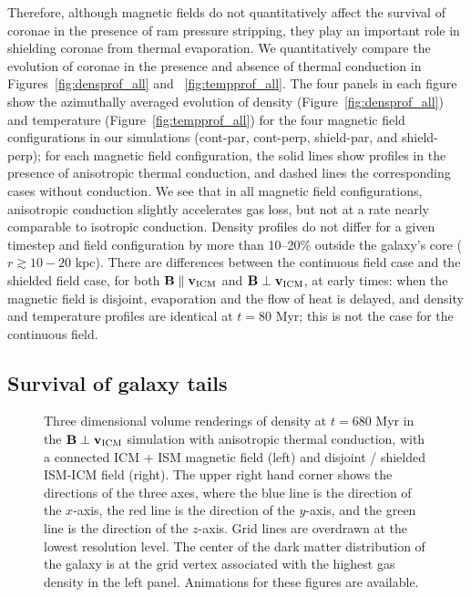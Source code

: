 \documentclass[twocolumn]{aastex6}
\begin{document}
Therefore, although magnetic fields do not quantitatively affect the survival of coronae in the presence of ram pressure stripping, they play an important role in shielding coronae from thermal evaporation. We quantitatively compare the evolution of coronae in the presence and absence of thermal conduction in Figures~\ref{fig:densprof_all} and ~\ref{fig:tempprof_all}. The four panels in each figure show the azimuthally averaged evolution of density (Figure~\ref{fig:densprof_all}) and temperature (Figure~\ref{fig:tempprof_all}) for the four magnetic field configurations in our simulations (cont-par, cont-perp, shield-par, and shield-perp); for each magnetic field configuration, the solid lines show profiles in the presence of anisotropic thermal conduction, and dashed lines the corresponding cases without conduction. We see that in all magnetic field configurations, anisotropic conduction slightly accelerates gas loss, but not at a rate nearly comparable to isotropic conduction.
Density profiles do not differ for a given timestep and field configuration by more than 10--20\% outside the galaxy's core ($r \gtrsim 10 - 20$ kpc). There are differences between the continuous field case and the shielded field case, for both $\mathbf{B} \parallel \mathbf{v_{\rm ICM}}$  and $\mathbf{B} \perp \mathbf{v_{\rm ICM}}$, at early times: when the magnetic field is disjoint, evaporation and the flow of heat is delayed, and density and temperature profiles are identical at $t = 80$ Myr; this is not the case for the continuous field.  

\subsection{Survival of galaxy tails}


\begin{figure*}[!htbp]
  \begin{center}
     \caption{Three dimensional volume renderings of density at $t = 680$ Myr in the  $\mathbf{B} \perp \mathbf{v_{\rm ICM}}$ simulation with anisotropic thermal conduction, with a connected ICM + ISM magnetic field (left) and   disjoint / shielded ISM-ICM field (right). The upper right hand corner shows the directions of the three axes, where the blue line is the direction of the $x$-axis, the red line is the direction of the $y$-axis, and the green line is the direction of the $z$-axis. Grid lines are overdrawn at the lowest resolution level.
 The center of the dark matter distribution of the galaxy is at the grid vertex associated with the highest gas density in the left panel. Animations for these figures are available.         
      \label{fig:3d_doubletail}}
  \end{center}  
\end{figure*}
\end{document}
